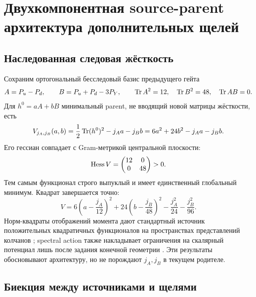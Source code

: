 \chapter{Двухкомпонентная source-parent архитектура дополнительных щелей}
\label{ch:v8-extra-mass-two-source-parent}

\section{Наследованная следовая жёсткость}

Сохраним ортогональный бесследовый базис предыдущего гейта
\begin{equation}
 A=P_u-P_d,\qquad B=P_u+P_d-3P_Y,
 \qquad \operatorname{Tr} A^2=12,\quad \operatorname{Tr} B^2=48,\quad \operatorname{Tr} AB=0.
 \label{eq:v8-extra-mass-two-source-basis}
\end{equation}
Для $h^0=aA+bB$ минимальный parent, не вводящий новой матрицы жёсткости,
есть
\begin{equation}
 V_{j_A,j_B}(a,b)=\frac12\operatorname{Tr}(h^0)^2-j_Aa-j_Bb
 =6a^2+24b^2-j_Aa-j_Bb.
 \label{eq:v8-extra-mass-two-source-potential}
\end{equation}
Его гессиан совпадает с Gram-метрикой центральной плоскости:
\begin{equation}
 \operatorname{Hess} V=\begin{pmatrix}12&0\\0&48\end{pmatrix}>0.
 \label{eq:v8-extra-mass-two-source-hessian}
\end{equation}
Тем самым функционал строго выпуклый и имеет единственный глобальный минимум.
Квадрат завершается точно:
\begin{equation}
 V=6\left(a-\frac{j_A}{12}\right)^2
 +24\left(b-\frac{j_B}{48}\right)^2
 -\frac{j_A^2}{24}-\frac{j_B^2}{96}.
 \label{eq:v8-extra-mass-two-source-completed-square}
\end{equation}
Норм-квадраты отображений момента дают стандартный источник положительных
квадратичных функционалов на пространствах представлений колчанов
\cite{v8-two-source-harada-wilkin}; spectral action также накладывает
ограничения на скалярный потенциал лишь после задания конечной геометрии
\cite{v8-two-source-krajewski}. Эти результаты обосновывают архитектуру, но
не порождают $j_A,j_B$ в текущем родителе.

\section{Биекция между источниками и щелями}

